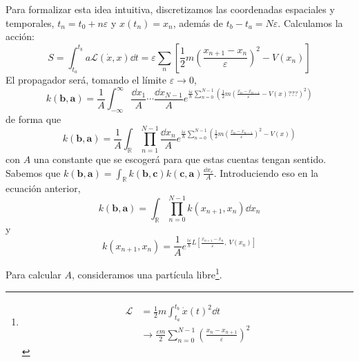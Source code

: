 \documentclass[a4paper,11pt]{tufte-book}
\begin{document}
Para formalizar esta idea intuitiva, discretizamos las coordenadas
espaciales y temporales, $t_n = t_0 + n ε$ y $x(t_n) = x_n$, además de
$t_b-t_a=Nε$.
Calculamos la acción:
\begin{equation}
  S = \int_{t_a}^{t_b}a \mathcal{L}(\dot{x},x) \dd{t}= ε\sum_{n}
  \left[ \frac{1}{2} m \left( \frac{x_{n+1}-x_n}{ε} \right)^2 -V(x_n)
  \right]
\end{equation}
El propagador será, tomando el límite $ε\to 0$,
\begin{equation}
  k(\mathbf{b},\mathbf{a}) =  \frac{1}{A} \int_{-\infty}^{\infty}
  \frac{\dd{x_1}}{A} \cdots \frac{\dd{x_{N-1}}}{A} e^{\frac{iε}{ℏ}
    \sum_{n=0}^{N-1} \left( \frac{1}{2}m \left( \frac{x_n-x_{n-1}}{ε} -V(x)??? \right)^2 \right)}
\end{equation}
de forma que
\begin{equation}
  k(\mathbf{b},\mathbf{a}) = \frac{1}{A} \int_{\mathbb{R}}
  \prod_{n=1}^{N-1} \frac{\dd{x_n}}{A}
e^{\frac{iε}{ℏ}
    \sum_{n=0}^{N-1} \left( \frac{1}{2}m \left( \frac{x_n-x_{n-1}}{ε} \right)^2  -V(x)\right)}
\end{equation}
con $A$ una constante que se escogerá para que estas cuentas tengan sentido.
Sabemos que $k(\mathbf{b},\mathbf{a})= \int_{\mathbb{R}}
k(\mathbf{b},\mathbf{c}) k(\mathbf{c},\mathbf{a}) \frac{\dd{x_c}}{A}$.
Introduciendo eso en la ecuación anterior,
\begin{equation}
  k(\mathbf{b},\mathbf{a}) = \int_{\mathbb{R}} \prod_{n=0}^{N-1}
  k(x_{n+1},x_n) \dd{x_n}
\end{equation}
y
\begin{equation*}
  k(x_{n+1},x_n) = \frac{1}{A} e^{\frac{iε}{ℏ} L \left[
      \frac{x_{n+1}-x_n}{ε},\ V(x_n) \right]}
\end{equation*}

Para calcular $A$, consideramos una partícula libre\footnote{
  \begin{equation}
    \begin{split}
      \mathcal{L} &= \frac{1}{2} m \int_{t_a}^{t_b} \dot{x}(t)^2
      \dd{t} \\
      &\to \frac{εm}{2} \sum_{n=0}^{N-1} \left( \frac{x_n-x_{n+1}}{ε}
      \right)^2
    \end{split}
  \end{equation}
}.
\end{document}
